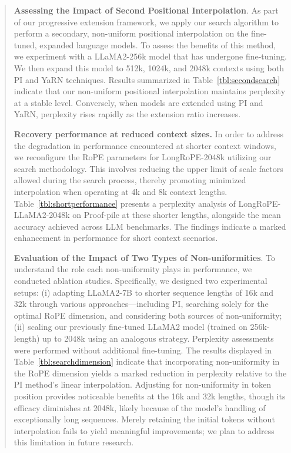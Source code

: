 \begin{abstract}
\textbf{Assessing the Impact of Second Positional Interpolation}. As part of our progressive extension framework, we apply our search algorithm to perform a secondary, non-uniform positional interpolation on the fine-tuned, expanded language models. To assess the benefits of this method, we experiment with a LLaMA2-256k model that has undergone fine-tuning. We then expand this model to 512k, 1024k, and 2048k contexts using both PI and YaRN techniques. Results summarized in Table~\ref{tbl:secondsearch} indicate that our non-uniform positional interpolation maintains perplexity at a stable level. Conversely, when models are extended using PI and YaRN, perplexity rises rapidly as the extension ratio increases.

\textbf{Recovery performance at reduced context sizes.} In order to address the degradation in performance encountered at shorter context windows, we reconfigure the RoPE parameters for LongRoPE-2048k utilizing our search methodology. This involves reducing the upper limit of scale factors allowed during the search process, thereby promoting minimized interpolation when operating at 4k and 8k context lengths. Table~\ref{tbl:shortperformance} presents a perplexity analysis of LongRoPE-LLaMA2-2048k on Proof-pile at these shorter lengths, alongside the mean accuracy achieved across LLM benchmarks. The findings indicate a marked enhancement in performance for short context scenarios.

\textbf{Evaluation of the Impact of Two Types of Non-uniformities}. To understand the role each non-uniformity plays in performance, we conducted ablation studies. Specifically, we designed two experimental setups: (i) adapting LLaMA2-7B to shorter sequence lengths of 16k and 32k through various approaches—including PI, searching solely for the optimal RoPE dimension, and considering both sources of non-uniformity; (ii) scaling our previously fine-tuned LLaMA2 model (trained on 256k-length) up to 2048k using an analogous strategy. Perplexity assessments were performed without additional fine-tuning. The results displayed in Table~\ref{tbl:searchdimension} indicate that incorporating non-uniformity in the RoPE dimension yields a marked reduction in perplexity relative to the PI method’s linear interpolation. Adjusting for non-uniformity in token position provides noticeable benefits at the 16k and 32k lengths, though its efficacy diminishes at 2048k, likely because of the model’s handling of exceptionally long sequences. Merely retaining the initial tokens without interpolation fails to yield meaningful improvements; we plan to address this limitation in future research.


\end{abstract}

